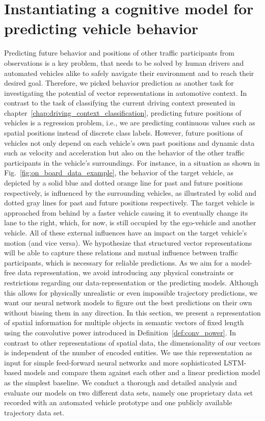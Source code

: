 \chapter{Instantiating a cognitive model for predicting vehicle behavior}
\label{chap:behav_pred}


Predicting future behavior and positions of other traffic participants from observations is a key problem, that needs to be solved by human drivers and automated vehicles alike to safely navigate their environment and to reach their desired goal.
Therefore, we picked behavior prediction as another task for investigating the potential of vector representations in automotive context.
In contrast to the task of classifying the current driving context presented in chapter~\ref{chap:driving_context_classification}, predicting future positions of vehicles is a regression problem, i.e., we are predicting continuous values such as spatial positions instead of discrete class labels.
However, future positions of vehicles not only depend on each vehicle's own past positions and dynamic data such as velocity and acceleration but also on the behavior of the other traffic participants in the vehicle's surroundings.
For instance, in a situation as shown in Fig.~\ref{fig:on_board_data_example}, the behavior of the target vehicle, as depicted by a solid blue and dotted orange line for past and future positions respectively, is influenced by the surrounding vehicles, as illustrated by solid and dotted gray lines for past and future positions respectively.
The target vehicle is approached from behind by a faster vehicle causing it to eventually change its lane to the right, which, for now, is still occupied by the ego-vehicle and another vehicle.
All of these external influences have an impact on the target vehicle's motion (and vice versa).
We hypothesize that structured vector representations will be able to capture these relations and mutual influence between traffic participants, which is necessary for reliable predictions.
As we aim for a model-free data representation, we avoid introducing any physical constraints or restrictions regarding our data-representation or the predicting models.
Although this allows for physically unrealistic or even impossible trajectory predictions, we want our neural network models to figure out the best predictions on their own without biasing them in any direction.
In this section, we present a representation of spatial information for multiple objects in semantic vectors of fixed length using the convolutive power introduced in Definition~\ref{def:conv_power}.
In contrast to other representations of spatial data, the dimensionality of our vectors is independent of the number of encoded entities.
We use this representation as input for simple feed-forward neural networks and more sophisticated \ac{LSTM}-based models and compare them against each other and a linear prediction model as the simplest baseline.
We conduct a thorough and detailed analysis and evaluate our  models on two different data sets, namely one proprietary data set recorded with an automated vehicle prototype and one publicly available trajectory data set.

